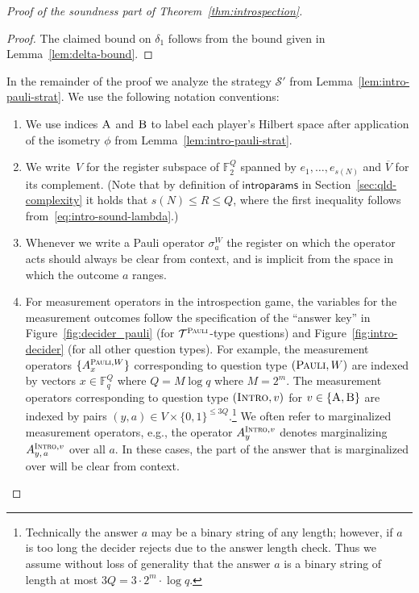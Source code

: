 \documentclass[11pt]{article}
\theoremstyle{definition}
\newcommand{\F}{\ensuremath{\mathbb{F}}}
\newcommand{\strategy}{\mathscr{S}}
\newcommand{\type}{\mathcal{T}}
\newcommand{\labelstyle}[1]{\ensuremath{\textsc{#1}}\xspace}
\newcommand{\trole}{\ensuremath{v}}
\newcommand{\alice}{\labelstyle{A}}
\newcommand{\bob}{\labelstyle{B}}
\newcommand{\typestyle}[1]{\ensuremath{\textsc{#1}}\xspace}
\newcommand{\Pauli}{\typestyle{Pauli}}
\newcommand{\Intro}{\typestyle{Intro}}
\newcommand{\AB}{\{\alice, \bob\}}
\newcommand{\introparams}{\mathsf{introparams}}
\begin{document}
\begin{proof}[Proof of the soundness part of Theorem~\ref{thm:introspection}]
\begin{proof}
    The claimed bound on $\delta_1$ follows from the bound given in
    Lemma~\ref{lem:delta-bound}.
  \end{proof}
	
  In the remainder of the proof we analyze the strategy $\strategy'$ from
  Lemma~\ref{lem:intro-pauli-strat}.
  We use the following notation conventions:
  \begin{enumerate}
  \item We use indices $\alice$ and $\bob$ to label each player's Hilbert space
    after application of the isometry $\phi$ from
    Lemma~\ref{lem:intro-pauli-strat}.

  \item We write~$V$ for the register subspace of $\F_2^{Q}$ spanned by $e_1,
    \ldots, e_{s(N)}$ and $\overline{V}$ for its complement.
    (Note that by definition of $\introparams$ in
    Section~\ref{sec:qld-complexity} it holds that $s(N)\leq R \leq Q$, where
    the first inequality follows from~\eqref{eq:intro-sound-lambda}.)

  \item Whenever we write a Pauli operator $\sigma^W_a$ the register on which
    the operator acts should always be clear from context, and is implicit from
    the space in which the outcome $a$ ranges.
  
  \item For measurement operators in the introspection game, the variables for
    the measurement outcomes follow the specification of the ``answer key'' in
    Figure~\ref{fig:decider_pauli} (for $\type^\Pauli$-type questions) and
    Figure~\ref{fig:intro-decider} (for all other question types).
    For example, the measurement operators $\{A_x^{\Pauli,W} \}$ corresponding
    to question type $(\Pauli,W)$ are indexed by vectors $x \in \F_q^Q$ where $Q
    = M \log q$ where $M = 2^m$.
    The measurement operators corresponding to question type $(\Intro,\trole)$
    for $\trole \in \AB$ are indexed by pairs $(y,a) \in V \times \{0,1\}^{\leq
      3Q}$.\footnote{Technically the answer $a$ may be a binary string of any
      length; however, if $a$ is too long the decider rejects due to the answer
      length check.
      Thus we assume without loss of generality that the answer $a$ is a binary
      string of length at most $3Q = 3\cdot 2^m \cdot \log q$.}
    We often refer to marginalized measurement operators, e.g., the operator
    $A^{\Intro,\trole}_{y}$ denotes marginalizing $A^{\Intro,\trole}_{y,\, a}$ over
    all $a$.
    In these cases, the part of the answer that is marginalized over will be
    clear from context.
		

\end{enumerate}
\end{proof}
\end{document}
